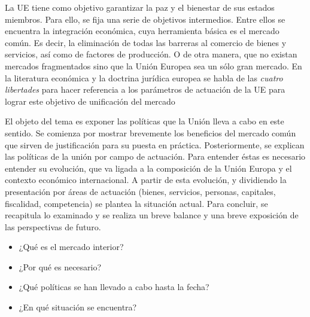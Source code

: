 \documentclass{nuevotema}
\begin{document}
\ideaclave

La UE tiene como objetivo garantizar la paz y el bienestar de sus estados miembros. Para ello, se fija una serie de objetivos intermedios. Entre ellos se encuentra la integración económica, cuya herramienta básica es el mercado común. Es decir, la eliminación de todas las barreras al comercio de bienes y servicios, así como de factores de producción. O de otra manera, que no existan mercados fragmentados sino que la Unión Europea sea un sólo gran mercado. En la literatura económica y la doctrina jurídica europea se habla de las \textit{cuatro libertades} para hacer referencia a los parámetros de actuación de la UE para lograr este objetivo de unificación del mercado

El objeto del tema es exponer las políticas que la Unión lleva a cabo en este sentido. Se comienza por mostrar brevemente los beneficios del mercado común que sirven de justificación para su puesta en práctica. Posteriormente, se explican las políticas de la unión por campo de actuación. Para entender éstas es necesario entender su evolución, que va ligada a la composición de la Unión Europa y el contexto económico internacional. A partir de esta evolución, y dividiendo la presentación por áreas de actuación (bienes, servicios, personas, capitales, fiscalidad, competencia) se plantea la situación actual. Para concluir, se recapitula lo examinado y se realiza un breve balance y una breve exposición de las perspectivas de futuro.


\begin{itemize}
	\item ¿Qué es el mercado interior?
	\item ¿Por qué es necesario?
	\item ¿Qué políticas se han llevado a cabo hasta la fecha?
	\item ¿En qué situación se encuentra?
\end{itemize}

\esquemacorto
\end{document}
